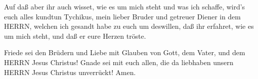  Auf daß aber ihr auch wisset, wie es um mich steht und was
ich schaffe, wird's euch alles kundtun Tychikus, mein lieber Bruder und
getreuer Diener in dem HERRN,  welchen ich gesandt habe zu
euch um deswillen, daß ihr erfahret, wie es um mich steht, und daß er
eure Herzen tröste.

 Friede sei den Brüdern und Liebe mit Glauben von Gott, dem
Vater, und dem HERRN Jesus Christus!  Gnade sei mit euch
allen, die da liebhaben unsern HERRN Jesus Christus unverrückt! Amen.
